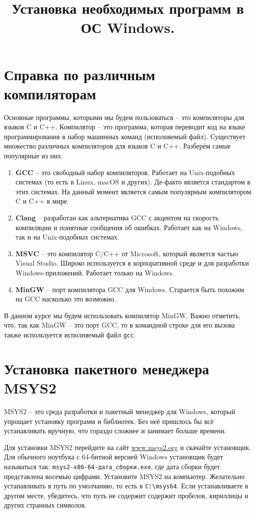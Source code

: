 \documentclass{article}
\begin{document}
\title{Установка необходимых программ в ОС Windows. \vspace{-5ex}}\date{}\maketitle
\section*{Справка по различным компиляторам}
Основные программы, которыми мы будем пользоваться -- это компиляторы для языков C и C++. Компилятор -- это программа, которая переводит код на языке программирования в набор машинных команд (исполняемый файл). Существует множество различных компиляторов для языков C и C++. Разберём самые популярные из них.

\begin{enumerate}
\item \textbf{GCC} -- это свободный набор компиляторов. Работает на Unix-подобных системах (то есть в Linux, macOS и других). Де-факто является стандартом в этих системах. На данный момент является самым популярным компилятором C и C++ в мире. 
\item \textbf{Clang} -- разработан как альтернатива GCC с акцентом на скорость компиляции и понятные сообщения об ошибках. Работает как на Windows, так и на Unix-подобных системах.
\item \textbf{MSVC} -- это компилятор C/C++ от Microsoft, который является частью Visual Studio. Широко используется в корпоративной среде и для разработки Windows-приложений. Работает только на Windows.
\item \textbf{MinGW} -- порт компилятора GCC для Windows. Старается быть похожим на GCC насколько это возможно.
\end{enumerate}
В данном курсе мы будем использовать компилятор MinGW. Важно отметить, что, так как MinGW -- это порт GCC, то в командной строке для его вызова также используется исполняемый файл \texttt{gcc}.


\section*{Установка пакетного менеджера MSYS2}
MSYS2 -- это среда разработки и пакетный менеджер для Windows, который упрощает установку программ и библиотек. Без неё пришлось бы всё устанавливать вручную, что гораздо сложнее и занимает больше времени.

Для установки MSYS2 перейдите на сайт \href{https://www.msys2.org/}{www.msys2.org} и скачайте установщик. Для обычного ноутбука с 64-битной версией Windows установщик будет называться так: \texttt{msys2-x86-64-дата\_сборки.exe}, где дата сборки будет представлена восемью цифрами. Установите MSYS2 на компьютер. Желательно устанавливать в путь по умолчанию, то есть в \texttt{C:\textbackslash msys64}. Если устанавливаете в другом месте, убедитесь, что путь не содержит содержит пробелов, кириллицы и других странных символов.
\end{document}
